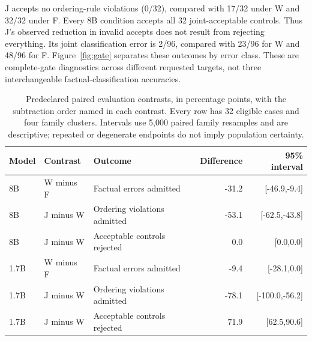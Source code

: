 \documentclass[10pt,letterpaper,twocolumn]{article}
\begin{document}
J accepts no ordering-rule violations (0/32), compared with 17/32 under W and 32/32 under F. Every 8B condition accepts all 32 joint-acceptable controls. Thus J's observed reduction in invalid accepts does not result from rejecting everything. Its joint classification error is 2/96, compared with 23/96 for W and 48/96 for F. Figure~\ref{fig:gate} separates these outcomes by error class. These are complete-gate diagnostics across different requested targets, not three interchangeable factual-classification accuracies.

\begin{table}[t]
\centering\small


\begin{tabular}{@{}lllrr@{}}
\toprule
Model & Contrast & Outcome & Difference & 95\% interval\\
\midrule
8B & W minus F & Factual errors admitted & -31.2 & [-46.9,-9.4]\\
8B & J minus W & Ordering violations admitted & -53.1 & [-62.5,-43.8]\\
8B & J minus W & Acceptable controls rejected & 0.0 & [0.0,0.0]\\
1.7B & W minus F & Factual errors admitted & -9.4 & [-28.1,0.0]\\
1.7B & J minus W & Ordering violations admitted & -78.1 & [-100.0,-56.2]\\
1.7B & J minus W & Acceptable controls rejected & 71.9 & [62.5,90.6]\\
\bottomrule
\end{tabular}
\caption{Predeclared paired evaluation contrasts, in percentage points, with the subtraction order named in each contrast. Every row has 32 eligible cases and four family clusters. Intervals use 5,000 paired family resamples and are descriptive; repeated or degenerate endpoints do not imply population certainty.}
\label{tab:contrasts}
\end{table}
\end{document}
